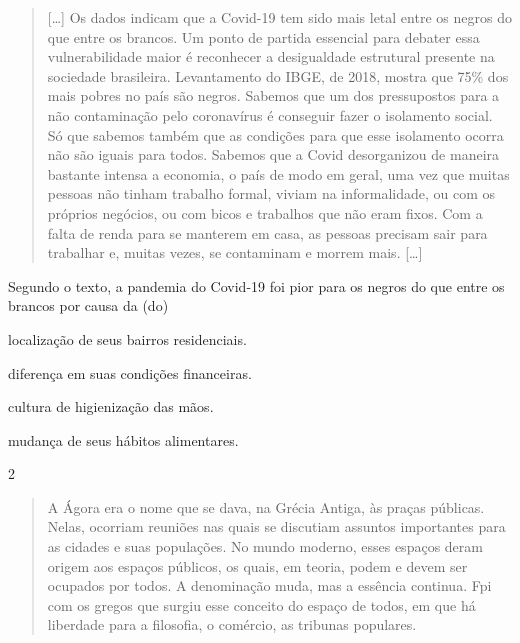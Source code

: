 \begin{quote}
{[}\ldots{}{]} Os dados indicam que a Covid-19 tem sido mais letal entre os negros
do que entre os brancos. Um ponto de partida essencial para debater essa
vulnerabilidade maior é reconhecer a desigualdade estrutural presente na
sociedade brasileira. Levantamento do IBGE, de 2018, mostra que 75\% dos
mais pobres no país são negros. Sabemos que um dos pressupostos para a
não contaminação pelo coronavírus é conseguir fazer o isolamento social.
Só que sabemos também que as condições para que esse isolamento ocorra
não são iguais para todos. Sabemos que a Covid desorganizou de maneira
bastante intensa a economia, o país de modo em geral, uma vez que muitas
pessoas não tinham trabalho formal, viviam na informalidade, ou com os
próprios negócios, ou com bicos e trabalhos que não eram fixos. Com a
falta de renda para se manterem em casa, as pessoas precisam sair para
trabalhar e, muitas vezes, se contaminam e morrem mais. {[}\ldots{}{]} 

\end{quote}

Segundo o texto, a pandemia do Covid-19 foi pior para os negros do que
entre os brancos por causa da (do)

\begin{escolha}
\item localização de seus bairros residenciais.

\item diferença em suas condições financeiras.

\item cultura de higienização das mãos.

\item mudança de seus hábitos alimentares.
\end{escolha}


\num{2}

\begin{quote}
A Ágora era o nome que se dava, na Grécia Antiga, às praças públicas. Nelas, ocorriam reuniões nas quais se discutiam assuntos importantes para as cidades e suas populações. No mundo moderno, esses espaços deram origem aos espaços públicos, os quais, em teoria, podem e devem ser ocupados por todos. 
A denominação muda, mas a essência continua. Fpi com os gregos que surgiu esse conceito do espaço de todos, em que há liberdade para a filosofia, o comércio, as tribunas populares.
\end{quote}

